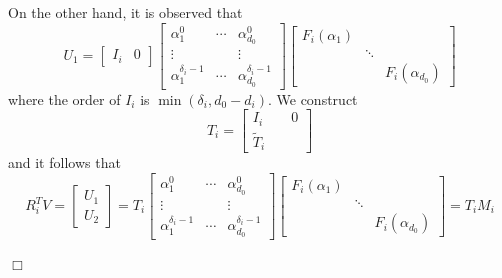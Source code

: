 \documentclass{article}
\newenvironment{proof}{\noindent{\em Proof:}}{$\Box$~\\}
\begin{document}
\begin{proof}
On the other hand, it is observed that
\[U_1=\begin{bmatrix}
I_i&0
\end{bmatrix}
\begin{bmatrix}
{\alpha}_1^0&\cdots&{\alpha}_{d_0}^0\\
\vdots&&\vdots\\
{\alpha}_1^{\delta_i-1}&\cdots&{\alpha}_{d_0}^{\delta_i-1}
\end{bmatrix}
\begin{bmatrix}
{F_i}({\alpha _1})\\
&\ddots&\\
&&{F_i}({\alpha _{d_0}})\end{bmatrix}\]
where the order of $I_i$ is $\min(\delta_i, d_0-d_i)$.
We construct
\[T_i=\left[\begin{array}{c}
I_{i}\qquad 0\\\hline
\tilde{T}_i
\end{array}\right]\]
and it follows that
\[R_i^TV=\begin{bmatrix}U_1\\[3pt]U_2\end{bmatrix}=T_i\begin{bmatrix}
{\alpha}_1^0&\cdots&{\alpha}_{d_0}^0\\
\vdots&&\vdots\\
{\alpha}_1^{\delta_i-1}&\cdots&{\alpha}_{d_0}^{\delta_i-1}
\end{bmatrix}
\begin{bmatrix}
{F_i}({\alpha _1})\\
&\ddots&\\
&&{F_i}({\alpha _{d_0}})\end{bmatrix}=T_iM_i\]


\end{proof}
\end{document}
